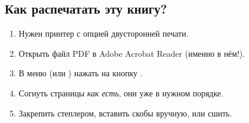 \documentclass[a5paper,11pt]{memoir}
\begin{document}
{%

\subsection{Как распечатать эту книгу?}


\begin{enumerate}
	\item Нужен принтер с опцией двусторонней печати.
	\item Открыть файл PDF в Adobe Acrobat Reader (именно в нём!).
	\item В меню  (или ) нажать на кнопку .
	\item Согнуть %
	страницы \emph{как есть}, они уже в нужном порядке.
	\item Закрепить степлером, вставить скобы вручную, или сшить.
\end{enumerate}




}
\newpage

\addto\captionsrussian{ 
}
\begin{KeepFromToc}
  \tableofcontents
\end{KeepFromToc}
\end{document}
